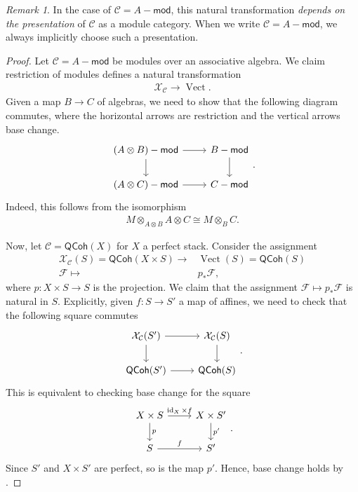 \documentclass{article}
\numberwithin{equation}{section}
\theoremstyle{quest}
\theoremstyle{definition}
\theoremstyle{remark}
\newtheorem{rmk}[thm]{Remark}
\newcommand{\msf}{\mathsf}
\newcommand{\Mod}{-\msf{mod}}
\DeclareMathOperator{\id}{id}
\DeclareMathOperator{\Vect}{Vect}
\begin{document}
\begin{rmk}
	In the case of $\mathcal{C}=A\Mod$, this natural transformation \textit{depends on the presentation} of $\mathcal{C}$ as a module category. When we write $\mathcal{C}=A\Mod$, we always implicitly choose such a presentation.
\end{rmk} 
\begin{proof}
Let $\mathcal{C}=A\Mod$ be modules over an associative algebra. We claim restriction of modules defines a natural transformation
\begin{align*}
	\mathcal{X}_{\mathcal{C}}\to \Vect.
\end{align*} 
Given a map $B\to C$ of algebras, we need to show that the following diagram commutes, where the horizontal arrows are restriction and the vertical arrows base change.
\[
\begin{tikzcd}
	(A\otimes B)\Mod\arrow[r]\arrow[d]&B\Mod\arrow[d]\\
	(A\otimes C)\Mod\arrow[r]&C\Mod
\end{tikzcd}.
\] 
Indeed, this follows from the isomorphism
\begin{align*}
	M\otimes _{A\otimes B}A\otimes C\cong M\otimes _BC.
\end{align*} 

Now, let $\mathcal{C}=\mathsf{QCoh}(X)$ for $X$ a perfect stack. Consider the assignment
\begin{align*}
	\mathcal{X}_{\mathcal{C}}(S)=\mathsf{QCoh}(X\times S)\to& \Vect(S)=\mathsf{QCoh}(S)\\
	\mathscr{F}\mapsto &p_{*}\mathscr{F},
\end{align*} 
where $p:X\times S\to S$ is the projection. We claim that the assignment $\mathscr{F}\mapsto p_*\mathscr{F}$ is natural in $S$. Explicitly, given $f:S\to S'$ a map of affines, we need to check that the following square commutes
\[
\begin{tikzcd}
	\mathcal{X}_{\mathcal{C}}(S')\arrow[r]\arrow[d]&\mathcal{X}_{\mathcal{C}}(S)\arrow[d]\\
	\mathsf{QCoh}(S')\arrow[r]&\mathsf{QCoh}(S)
\end{tikzcd}.
\] 
This is equivalent to checking base change for the square
\[
\begin{tikzcd}
	X\times S\arrow[r,"\id_X\times f"]\arrow[d,"p"]&X\times S'\arrow[d,"p'"]\\
	S\arrow[r,"f"]&S'
\end{tikzcd}.
\] 
Since $S'$ and $X\times S'$ are perfect, so is the map $p'$. Hence, base change holds by \cite[Proposition 3.10]{BFN}. 
\end{proof}
\end{document}
